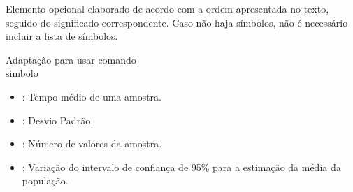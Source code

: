 Elemento opcional elaborado de acordo com a ordem apresentada no texto, seguido do significado correspondente. Caso não haja símbolos, não é necessário incluir a lista de símbolos.

Adaptação para usar comando \\simbolo{}

\begin{itemize}
	\item {}: Tempo médio de uma amostra.
	\item {}: Desvio Padrão.
	\item {}: Número de valores da amostra.
	\item {}: Variação do intervalo de confiança de 95\% para a estimação da média da população.
\end{itemize}


